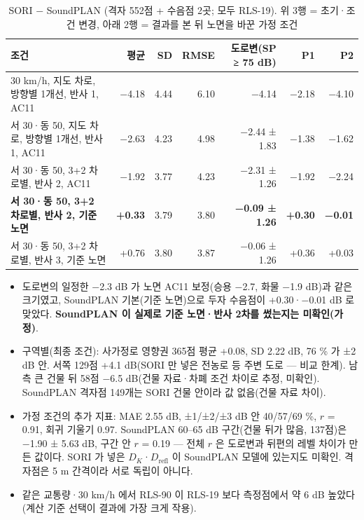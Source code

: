\documentclass[10pt,a4paper]{article}
\begin{document}
\begin{table}[h]\centering\small
\caption{SORI − SoundPLAN (격자 552점 + 수음점 2곳; 모두 RLS-19). 위 3행 = 초기·조건 변경, 아래 2행 = 결과를 본 뒤 노면을 바꾼 가정 조건}
\begin{tabular}{lrrrrrr}
\toprule
조건 & 평균 & SD & RMSE & 도로변(SP ≥ 75 dB) & P1 & P2 \\ \midrule
30 km/h, 지도 차로, 방향별 1개선, 반사 1, AC11 & −4.18 & 4.44 & 6.10 & −4.14 & −2.18 & −4.10 \\
서 30·동 50, 지도 차로, 방향별 1개선, 반사 1, AC11 & −2.63 & 4.23 & 4.98 & −2.44 ± 1.83 & −1.38 & −1.62 \\
서 30·동 50, 3+2 차로별, 반사 2, AC11 & −1.92 & 3.77 & 4.23 & −2.31 ± 1.26 & −1.92 & −2.24 \\
\textbf{서 30·동 50, 3+2 차로별, 반사 2, 기준 노면} & \textbf{+0.33} & 3.79 & 3.80 & \textbf{−0.09 ± 1.26} & \textbf{+0.30} & \textbf{−0.01} \\
서 30·동 50, 3+2 차로별, 반사 3, 기준 노면 & +0.76 & 3.80 & 3.87 & −0.06 ± 1.26 & +0.36 & +0.03 \\
\bottomrule
\end{tabular}
\end{table}
\begin{itemize}
\item 도로변의 일정한 −2.3 dB 가 노면 AC11 보정(승용 −2.7, 화물 −1.9 dB)과 같은 크기였고, SoundPLAN 기본(기준 노면)으로 두자 수음점이 +0.30·−0.01 dB 로 맞았다. \textbf{SoundPLAN 이 실제로 기준 노면·반사 2차를 썼는지는 미확인(가정)}.
\item 구역별(최종 조건): 사가정로 영향권 365점 평균 +0.08, SD 2.22 dB, 76 \% 가 ±2 dB 안. 서쪽 129점 +4.1 dB(SORI 만 넣은 전농로 등 주변 도로 — 비교 한계). 남측 큰 건물 뒤 58점 −6.5 dB(건물 자료·차폐 조건 차이로 추정, 미확인). SoundPLAN 격자점 149개는 SORI 건물 안이라 값 없음(건물 자료 차이).
\item 가정 조건의 추가 지표: MAE 2.55 dB, ±1/±2/±3 dB 안 40/57/69 \%, $r$ = 0.91, 회귀 기울기 0.97. SoundPLAN 60–65 dB 구간(건물 뒤가 많음, 137점)은 −1.90 ± 5.63 dB, 구간 안 $r$ = 0.19 — 전체 $r$ 은 도로변과 뒤편의 레벨 차이가 만든 값이다. SORI 가 넣은 $D_K$·$D_\mathrm{refl}$ 이 SoundPLAN 모델에 있는지도 미확인. 격자점은 5 m 간격이라 서로 독립이 아니다.
\item 같은 교통량·30 km/h 에서 RLS-90 이 RLS-19 보다 측정점에서 약 6 dB 높았다(계산 기준 선택이 결과에 가장 크게 작용).
\end{itemize}

\end{document}
